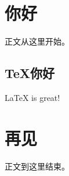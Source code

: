 \documentclass{cgdartcn}
\begin{document}
\title{}                %
\subtitle{}             %

\author{}               %
\docattr[
         docid={CGD-XX-xxx},        %
         email={},                  %
         type={},                   %
         status={}]                 %
\maketitle

\begin{abstract}         %
\end{abstract}

\begin{revisions} %
\end{revisions}

\frontmatter            %

\mainmatter
\section{你好}
正文从这里开始。

\subsection{\TeX 你好}
\LaTeX\cite{oetiker1995not} is great!
\section{再见}
正文到这里结束。

\appendix


\backmatter
\end{document}
